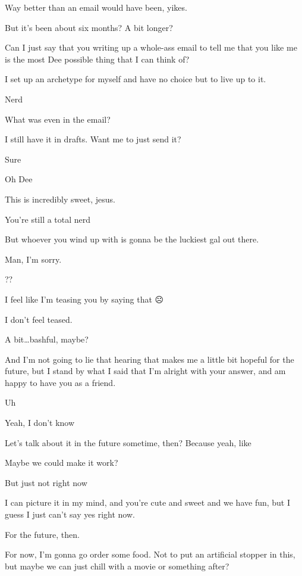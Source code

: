  Way better than an email would have been, yikes.

 But it's been about six months? A bit longer?

 Can I just say that you writing up a whole-ass email to tell me that you like me is the most Dee possible thing that I can think of?

 I set up an archetype for myself and have no choice but to live up to it.

 Nerd

 What was even in the email?

 I still have it in drafts. Want me to just send it?

 Sure

 Oh Dee

 This is incredibly sweet, jesus.

 You're still a total nerd

 But whoever you wind up with is gonna be the luckiest gal out there.

 Man, I'm sorry.

 ??

 I feel like I'm teasing you by saying that ☹

 I don't feel teased.

 A bit\ldots bashful, maybe?

 And I'm not going to lie that hearing that makes me a little bit hopeful for the future, but I stand by what I said that I'm alright with your answer, and am happy to have you as a friend.

 Uh

 Yeah, I don't know

 Let's talk about it in the future sometime, then? Because yeah, like

 Maybe we could make it work?

 But just not right now

 I can picture it in my mind, and you're cute and sweet and we have fun, but I guess I just can't say yes right now.

 For the future, then.

 For now, I'm gonna go order some food. Not to put an artificial stopper in this, but maybe we can just chill with a movie or something after?

